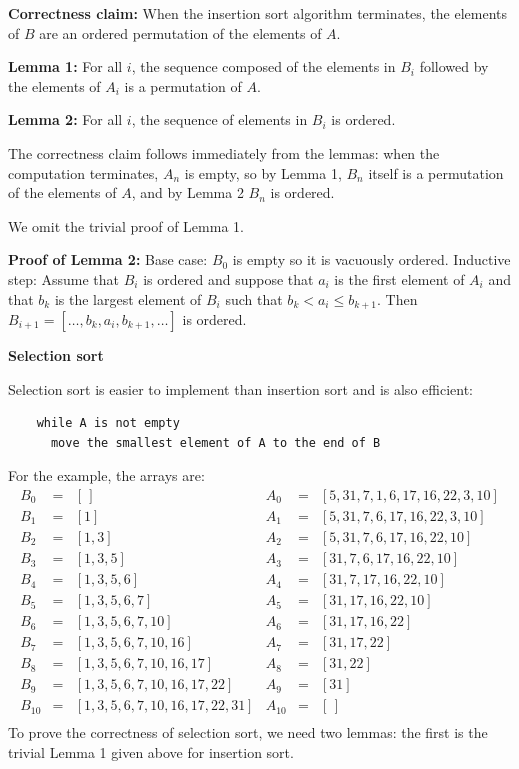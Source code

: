 \documentclass[11pt,a4paper]{report}
\begin{document}
\textbf{Correctness claim:} When the insertion sort algorithm terminates, the elements of $B$ are an ordered permutation of the elements of $A$.

\textbf{Lemma 1:} For all $i$, the sequence composed of the elements in $B_i$ followed by the elements of $A_i$ is a permutation of $A$.

\textbf{Lemma 2:} For all $i$, the sequence of elements in $B_i$ is ordered.

The correctness claim follows immediately from the lemmas: when the computation terminates, $A_n$ is empty, so by Lemma 1, $B_n$ itself is a permutation of the elements of $A$, and by Lemma 2 $B_n$ is ordered.

We omit the trivial proof of Lemma 1.

\textbf{Proof of Lemma 2:} Base case: $B_0$ is empty so it is vacuously ordered. Inductive step: Assume that $B_i$ is ordered and suppose that $a_i$ is the first element of $A_i$ and that $b_k$ is the largest element of $B_i$ such that $b_k < a_i \leq b_{k+1}$. Then $B_{i+1} = [\ldots,b_k,a_i,b_{k+1},\ldots]$ is ordered.

\bigskip

\textbf{\Large Selection sort}

Selection sort is easier to implement than insertion sort and is also efficient:
\begin{verbatim}
    while A is not empty
      move the smallest element of A to the end of B
\end{verbatim}
For the example, the arrays are:
\[
\begin{array}{lll}
B_0&=&[\,]\\
B_1&=&[1]\\
B_2&=&[1,3]\\
B_3&=&[1,3,5]\\
B_4&=&[1,3,5,6]\\
B_5&=&[1,3,5,6,7]\\
B_6&=&[1,3,5,6,7,10]\\
B_7&=&[1,3,5,6,7,10,16]\\
B_8&=&[1,3,5,6,7,10,16,17]\\
B_9&=&[1,3,5,6,7,10,16,17,22]\\
B_{10}&=&[1,3,5,6,7,10,16,17,22,31]\\
\end{array}
\begin{array}{lll}
A_0&=&[5,31,7,1,6,17,16,22,3,10]\\
A_1&=&[5,31,7,6,17,16,22,3,10]\\
A_2&=&[5,31,7,6,17,16,22,10]\\
A_3&=&[31,7,6,17,16,22,10]\\
A_4&=&[31,7,17,16,22,10]\\
A_5&=&[31,17,16,22,10]\\
A_6&=&[31,17,16,22]\\
A_7&=&[31,17,22]\\
A_8&=&[31,22]\\
A_9&=&[31]\\
A_{10}&=&[\,]\\
\end{array}
\]
To prove the correctness of selection sort, we need two lemmas: the first is the trivial Lemma 1 given above for insertion sort.
\end{document}
